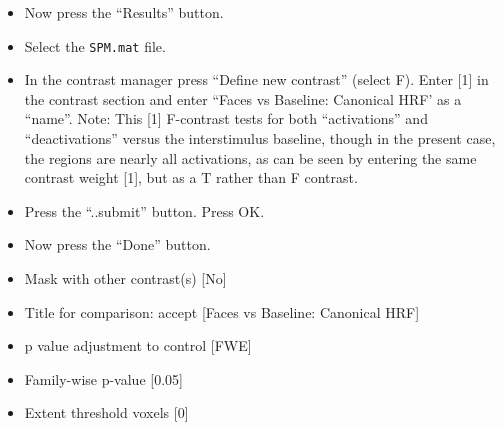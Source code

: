 \begin{itemize}
\item Now press the ``Results'' button.
\item Select the \texttt{SPM.mat} file.
\item In the contrast manager press ``Define new contrast'' (select F). Enter [1] in the contrast section and enter ``Faces vs Baseline: Canonical HRF' as a ``name''. Note: This [1] F-contrast tests for both ``activations'' and ``deactivations'' versus the interstimulus baseline, though in the present case, the regions are nearly all activations, as can be seen by entering the same contrast weight [1], but as a T rather than F contrast.
\item Press the ``..submit'' button. Press OK.
\item Now press the ``Done'' button.
\item Mask with other contrast(s) [No]
\item Title for comparison: accept [Faces vs Baseline: Canonical HRF]
\item p value adjustment to control [FWE]
\item Family-wise p-value [0.05]
\item Extent threshold {voxels} [0]
\end{itemize}

